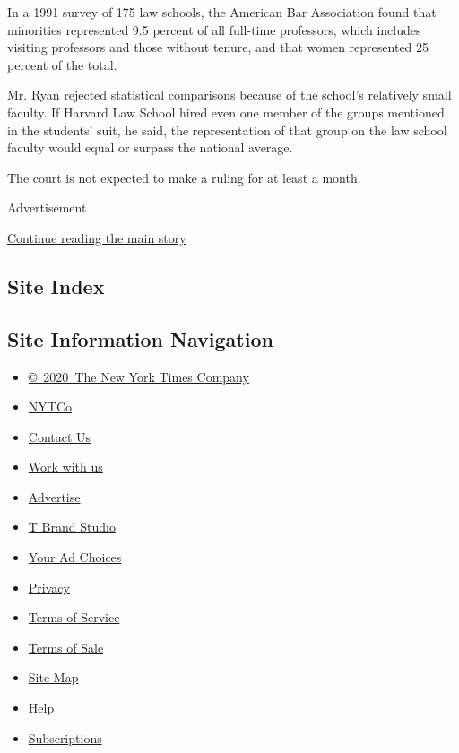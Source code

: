 In a 1991 survey of 175 law schools, the American Bar Association found
that minorities represented 9.5 percent of all full-time professors,
which includes visiting professors and those without tenure, and that
women represented 25 percent of the total.

Mr. Ryan rejected statistical comparisons because of the school's
relatively small faculty. If Harvard Law School hired even one member of
the groups mentioned in the students' suit, he said, the representation
of that group on the law school faculty would equal or surpass the
national average.

The court is not expected to make a ruling for at least a month.

Advertisement

\protect\hyperlink{after-bottom}{Continue reading the main story}

\hypertarget{site-index}{%
\subsection{Site Index}\label{site-index}}

\hypertarget{site-information-navigation}{%
\subsection{Site Information
Navigation}\label{site-information-navigation}}

\begin{itemize}
\tightlist
\item
  \href{https://help.nytimes.com/hc/en-us/articles/115014792127-Copyright-notice}{©~2020~The
  New York Times Company}
\end{itemize}

\begin{itemize}
\tightlist
\item
  \href{https://www.nytco.com/}{NYTCo}
\item
  \href{https://help.nytimes.com/hc/en-us/articles/115015385887-Contact-Us}{Contact
  Us}
\item
  \href{https://www.nytco.com/careers/}{Work with us}
\item
  \href{https://nytmediakit.com/}{Advertise}
\item
  \href{http://www.tbrandstudio.com/}{T Brand Studio}
\item
  \href{https://www.nytimes.com/privacy/cookie-policy\#how-do-i-manage-trackers}{Your
  Ad Choices}
\item
  \href{https://www.nytimes.com/privacy}{Privacy}
\item
  \href{https://help.nytimes.com/hc/en-us/articles/115014893428-Terms-of-service}{Terms
  of Service}
\item
  \href{https://help.nytimes.com/hc/en-us/articles/115014893968-Terms-of-sale}{Terms
  of Sale}
\item
  \href{https://spiderbites.nytimes.com}{Site Map}
\item
  \href{https://help.nytimes.com/hc/en-us}{Help}
\item
  \href{https://www.nytimes.com/subscription?campaignId=37WXW}{Subscriptions}
\end{itemize}
